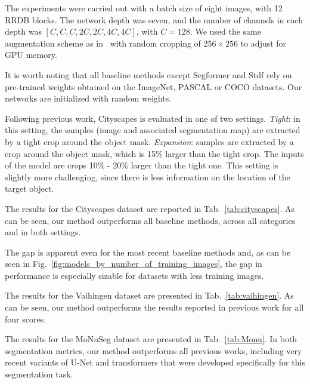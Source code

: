 \documentclass[10pt,twocolumn,letterpaper]{article}
\begin{document}
The experiments were carried out with a batch size of eight images, with 12 RRDB blocks. The network depth was seven, and the number of channels in each depth was $[C, C, C, 2C, 2C, 4C, 4C]$, with $C=128$. We used the same augmentation scheme as in~\cite{valanarasu2021medical} with random cropping of $256 \times 256$ to adjust for GPU memory.

It is worth noting that all baseline methods except Segformer and Stdf rely on pre-trained weights obtained on the ImageNet, PASCAL or COCO datasets. Our networks are initialized with random weights.

Following previous work, Cityscapes is evaluated in one of two settings. \textit{Tight}: in this setting, the samples (image and associated segmentation map) are extracted by a tight crop around the object mask. 
\textit{Expansion}: samples are extracted by a crop around the object mask, which is 15\% larger than the tight crop. The inputs of the model are crops 10\% - 20\% larger than the tight one. This setting is slightly more challenging, since there is less information on the location of the target object.

The results for the Cityscapes dataset are reported in Tab.~\ref{tab:cityscapes}. As can be seen, our method outperforms all baseline methods, across all categories and in both settings. 

The gap is apparent even for the most recent baseline methods and, as can be seen in Fig.~\ref{fig:models_by_number_of_training_images}, the gap in performance is especially sizable for datasets with less training images. 

The results for the Vaihingen dataset are presented in Tab.~\ref{tab:vaihingen}. As can be seen, our method outperforms the results reported in previous work for all four scores.

The results for the MoNuSeg dataset are presented in Tab.~\ref{tab:Monu}. In both segmentation metrics, our method outperforms all previous works, including very recent variants of U-Net and transformers that were developed specifically for this segmentation task.
\end{document}
